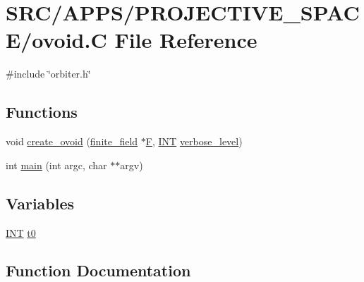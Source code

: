 \hypertarget{_p_r_o_j_e_c_t_i_v_e___s_p_a_c_e_2ovoid_8_c}{}\section{S\+R\+C/\+A\+P\+P\+S/\+P\+R\+O\+J\+E\+C\+T\+I\+V\+E\+\_\+\+S\+P\+A\+C\+E/ovoid.C File Reference}
\label{_p_r_o_j_e_c_t_i_v_e___s_p_a_c_e_2ovoid_8_c}
{\ttfamily \#include \char`\"{}orbiter.\+h\char`\"{}}\newline
\subsection*{Functions}
\begin{DoxyCompactItemize}
\item 
void \mbox{\hyperlink{_p_r_o_j_e_c_t_i_v_e___s_p_a_c_e_2ovoid_8_c_a812088e2c64cb8a0834e9eacae4b92a6}{create\+\_\+ovoid}} (\mbox{\hyperlink{classfinite__field}{finite\+\_\+field}} $\ast$\mbox{\hyperlink{simeon_8_c_a21a61c535ff7d9d4b674461d3b19fffa}{F}}, \mbox{\hyperlink{galois_8h_a09fddde158a3a20bd2dcadb609de11dc}{I\+NT}} \mbox{\hyperlink{simeon_8_c_a818073fbcc2f439e7c56952f67386122}{verbose\+\_\+level}})
\item 
int \mbox{\hyperlink{_p_r_o_j_e_c_t_i_v_e___s_p_a_c_e_2ovoid_8_c_a3c04138a5bfe5d72780bb7e82a18e627}{main}} (int argc, char $\ast$$\ast$argv)
\end{DoxyCompactItemize}
\subsection*{Variables}
\begin{DoxyCompactItemize}
\item 
\mbox{\hyperlink{galois_8h_a09fddde158a3a20bd2dcadb609de11dc}{I\+NT}} \mbox{\hyperlink{_p_r_o_j_e_c_t_i_v_e___s_p_a_c_e_2ovoid_8_c_a4268f4fe222ffb119218a0199f5e1904}{t0}}
\end{DoxyCompactItemize}


\subsection{Function Documentation}
\mbox{\label{_p_r_o_j_e_c_t_i_v_e___s_p_a_c_e_2ovoid_8_c_a812088e2c64cb8a0834e9eacae4b92a6}} 
